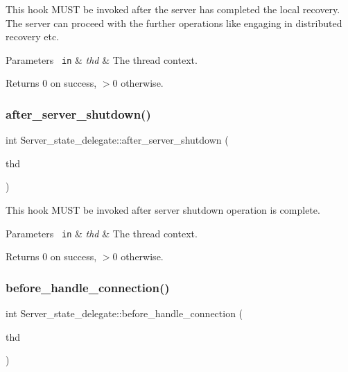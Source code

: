 This hook M\+U\+ST be invoked after the server has completed the local recovery. The server can proceed with the further operations like engaging in distributed recovery etc.


\begin{DoxyParams}[1]{Parameters}
\mbox{\texttt{ in}}  & {\em thd} & The thread context. \\
\hline
\end{DoxyParams}
\begin{DoxyReturn}{Returns}
0 on success, $>$0 otherwise. 
\end{DoxyReturn}
\mbox{\label{classServer__state__delegate_a16548382b069173cb1e1bb29b621dfe5}} 
\subsubsection{\texorpdfstring{after\+\_\+server\+\_\+shutdown()}{after\_server\_shutdown()}}
{\footnotesize\ttfamily int Server\+\_\+state\+\_\+delegate\+::after\+\_\+server\+\_\+shutdown (\begin{DoxyParamCaption}\item[{T\+HD $\ast$}]{thd }\end{DoxyParamCaption})}

This hook M\+U\+ST be invoked after server shutdown operation is complete.


\begin{DoxyParams}[1]{Parameters}
\mbox{\texttt{ in}}  & {\em thd} & The thread context. \\
\hline
\end{DoxyParams}
\begin{DoxyReturn}{Returns}
0 on success, $>$0 otherwise. 
\end{DoxyReturn}
\mbox{\label{classServer__state__delegate_a2571fe4639eca1ab37417c1cef9a051f}} 
\subsubsection{\texorpdfstring{before\+\_\+handle\+\_\+connection()}{before\_handle\_connection()}}
{\footnotesize\ttfamily int Server\+\_\+state\+\_\+delegate\+::before\+\_\+handle\+\_\+connection (\begin{DoxyParamCaption}\item[{T\+HD $\ast$}]{thd }\end{DoxyParamCaption})}

